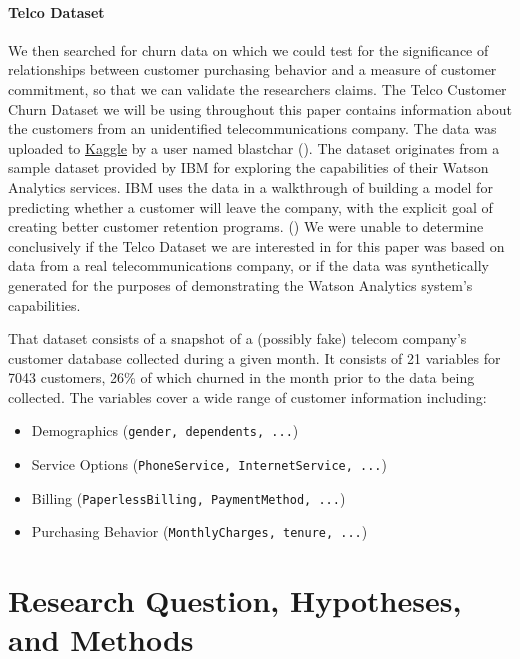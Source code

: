 \documentclass[man, floatsintext]{apa6}
\begin{document}
\hspace{0.5mm}

\paragraph{Telco Dataset}

We then searched for churn data on which we could test for the significance of relationships between customer purchasing behavior and a measure of customer commitment, so that we can validate the researchers claims. The Telco Customer Churn Dataset we will be using throughout this paper contains information about the customers from an unidentified telecommunications company. The data was uploaded to \href{https://www.kaggle.com/blastchar/telco-customer-churn}{Kaggle} by a user named blastchar (). The dataset originates from a sample dataset provided by IBM for exploring the capabilities of their Watson Analytics services. IBM uses the data in a walkthrough of building a model for predicting whether a customer will leave the company, with the explicit goal of creating better customer retention programs. (\cite{ibm_telco_2015}) We were unable to determine conclusively if the Telco Dataset we are interested in for this paper was based on data from a real telecommunications company, or if the data was synthetically generated for the purposes of demonstrating the Watson Analytics system's capabilities.

That dataset consists of a snapshot of a (possibly fake) telecom company's customer database collected during a given month. It consists of 21 variables for 7043 customers, 26\% of which churned in the month prior to the data being collected. The variables cover a wide range of customer information including:
\begin{itemize}
  \item Demographics (\texttt{gender, dependents, ...})
  \item Service Options (\texttt{PhoneService, InternetService, ...})
  \item Billing (\texttt{PaperlessBilling, PaymentMethod, ...})
  \item Purchasing Behavior (\texttt{MonthlyCharges, tenure, ...})
\end{itemize}

\section{Research Question, Hypotheses, and Methods}
\end{document}
